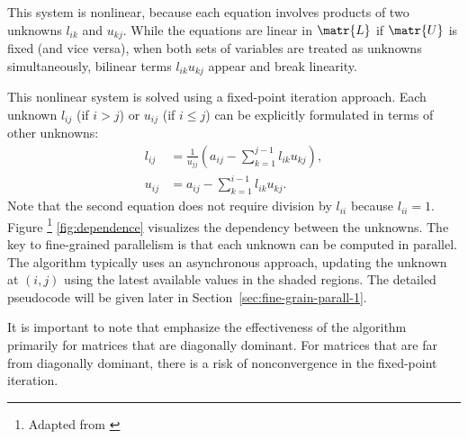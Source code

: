 This system is nonlinear, because each equation involves products of two
unknowns \(l_{ik}\) and \(u_{kj}\). While the equations are linear in
\(\matr{L}\) if \(\matr{U}\) is fixed (and vice versa), when both sets of
variables are treated as unknowns simultaneously, bilinear terms
\(l_{ik}u_{kj}\) appear and break linearity.

This nonlinear system is solved using a fixed-point iteration approach. Each
unknown \(l_{ij}\) (if \(i>j\)) or \(u_{ij}\) (if \(i \le j\)) can be explicitly
formulated in terms of other unknowns:
\begin{align*}
  l_{ij} &= \frac{1}{u_{jj}} \left(a_{ij} - \sum_{k=1}^{j-1} l_{ik}u_{kj} \right), \\
  u_{ij} &= a_{ij} - \sum_{k=1}^{i-1} l_{ik}u_{kj}.
\end{align*}
Note that the second equation does not require division by \(l_{ii}\) because
\(l_{ii} = 1\). Figure \footnote{Adapted from \cite{chow_fine-grained_2015}}
\ref{fig:dependence} visualizes the dependency between the unknowns. The key to
fine-grained parallelism is that each unknown can be computed in parallel. The
algorithm typically uses an asynchronous approach, updating the unknown at
\((i,j)\) using the latest available values in the shaded regions. The detailed
pseudocode will be given later in Section~\ref{sec:fine-grain-parall-1}.

It is important to note that \textcite{chow_fine-grained_2015} emphasize the
effectiveness of the algorithm primarily for matrices that are diagonally
dominant. For matrices that are far from diagonally dominant, there is a risk of
nonconvergence in the fixed-point iteration.

